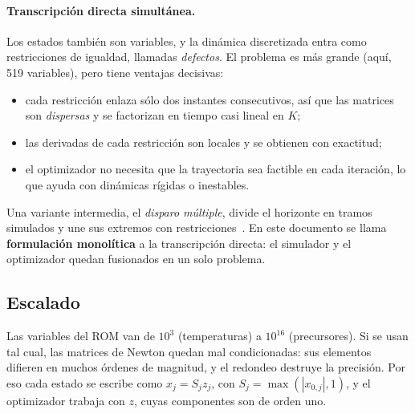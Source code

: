 \paragraph{Transcripción directa simultánea.} Los estados también son variables, y la
dinámica discretizada entra como restricciones de igualdad, llamadas \emph{defectos}. El
problema es más grande (aquí, 519 variables), pero tiene ventajas decisivas:
\begin{itemize}
  \item cada restricción enlaza sólo dos instantes consecutivos, así que las matrices son
        \emph{dispersas} y se factorizan en tiempo casi lineal en $K$;
  \item las derivadas de cada restricción son locales y se obtienen con exactitud;
  \item el optimizador no necesita que la trayectoria sea factible en cada iteración, lo que
        ayuda con dinámicas rígidas o inestables.
\end{itemize}
Una variante intermedia, el \emph{disparo múltiple}, divide el horizonte en tramos simulados y
une sus extremos con restricciones~\cite{bock1984}. En este documento se llama
\textbf{formulación monolítica} a la transcripción directa: el simulador y el optimizador quedan
fusionados en un solo problema.

\subsection{Escalado}
Las variables del ROM van de $10^3$ (temperaturas) a $10^{16}$ (precursores). Si se usan tal cual,
las matrices de Newton quedan mal condicionadas: sus elementos difieren en muchos órdenes de
magnitud, y el redondeo destruye la precisión. Por eso cada estado se escribe como $x_j=S_jz_j$,
con $S_j=\max(|x_{0,j}|,1)$, y el optimizador trabaja con $z$, cuyas componentes son de orden uno.

